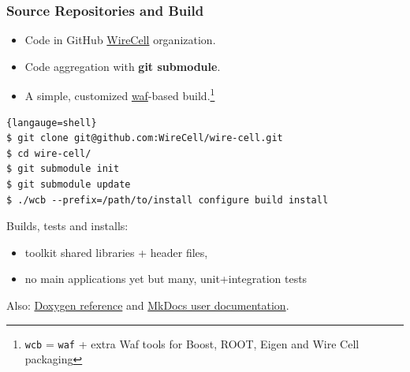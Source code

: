 \documentclass[xcolor=dvipsnames]{beamer}
\begin{document}
\begin{frame}[fragile]
  \frametitle{Source Repositories and Build}

  \begin{itemize}
  \item Code in GitHub \href{https://github.com/WireCell/}{WireCell} organization.
  \item Code aggregation with \textbf{git submodule}.
  \item A simple, customized \href{https://waf.io/}{waf}-based build.\footnote{\texttt{wcb} = \texttt{waf} + extra Waf tools for Boost, ROOT, Eigen and Wire Cell packaging}
  

  \end{itemize}

  \begin{lstlisting}{langauge=shell}
$ git clone git@github.com:WireCell/wire-cell.git
$ cd wire-cell/
$ git submodule init
$ git submodule update
$ ./wcb --prefix=/path/to/install configure build install
  \end{lstlisting}

  Builds, tests and installs:
  \begin{itemize}
  \item toolkit shared libraries + header files,
  \item no main applications yet but many, unit+integration tests
  \end{itemize}
  Also: \href{http://www.phy.bnl.gov/wire-cell/doxy/html/}{Doxygen reference} and \href{http://wirecell.github.io/wire-cell-docs/}{MkDocs user documentation}.


\end{frame}
\end{document}
